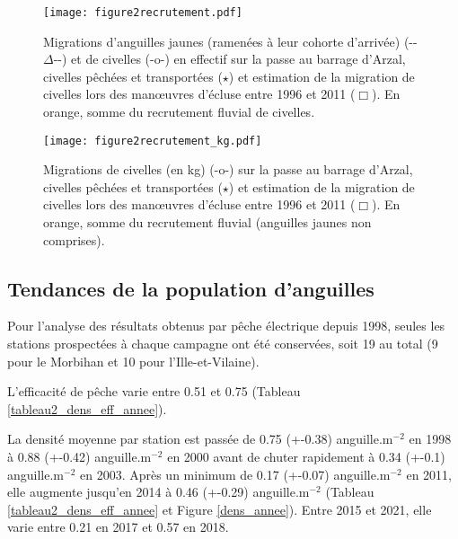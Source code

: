 \documentclass[10pt,twocolumn,titlepage,twoside]{article}\usepackage[]{graphicx}\usepackage[]{color}
\begin{document}
\begin{figure}[htbp]
\centering
\texttt{[image: figure2recrutement.pdf]}
\caption[Tendance des densités modèle]{Migrations d'anguilles
jaunes (ramenées à leur cohorte d'arrivée) (\textmd{{}-{}-${\Delta}$-{}-}) et de civelles
(\textmd{{}-}o\textmd{{}-}) en effectif sur la passe au barrage d'Arzal,
civelles pêchées et transportées ($\star$) et estimation de la migration de civelles
lors des man{\oe}uvres d'écluse entre 1996 et 2011 ($\Box$). En orange, somme du
recrutement fluvial de civelles.}
\label{figure2recrutement}
\end{figure}

\begin{figure}[htbp]
\centering
\texttt{[image: figure2recrutement\_kg.pdf]}
\caption[Tendance des densités modèle]{Migrations de civelles (en kg)
(\textmd{{}-}o\textmd{{}-}) sur la passe au barrage d'Arzal, civelles pêchées
et transportées ($\star$) et estimation de la migration de civelles
lors des man{\oe}uvres d'écluse entre 1996 et 2011 ($\Box$). En orange, somme du
recrutement fluvial (anguilles jaunes non comprises).}
\label{figure2recrutement_kg}
\end{figure}

\subsection{Tendances de la population d'anguilles}















Pour l'analyse des résultats obtenus par pêche
électrique depuis 1998, seules les stations prospectées à chaque
campagne ont été conservées, soit 19 au total (9 pour le Morbihan
et 10 pour l'Ille-et-Vilaine).
\small

\normalsize
L'efficacité de pêche varie entre 0.51 et
0.75 (Tableau \ref{tableau2_dens_eff_annee}). 

La densité moyenne par station est
passée de 0.75 (+-0.38) anguille.m$^{-2}$ en 1998 
à 0.88 (+-0.42) anguille.m$^{-2}$ en 2000 
avant de chuter rapidement à 0.34 (+-0.1) anguille.m$^{-2}$ en 2003. 
Après un minimum de 0.17
(+-0.07) anguille.m$^{-2}$ en 2011, elle augmente
jusqu'en 2014 à 0.46
(+-0.29) anguille.m$^{-2}$
(Tableau \ref{tableau2_dens_eff_annee} et Figure \ref{dens_annee}).
Entre 2015 et 2021, elle varie entre 0.21 en
2017 et 0.57 en 2018.
\end{document}
